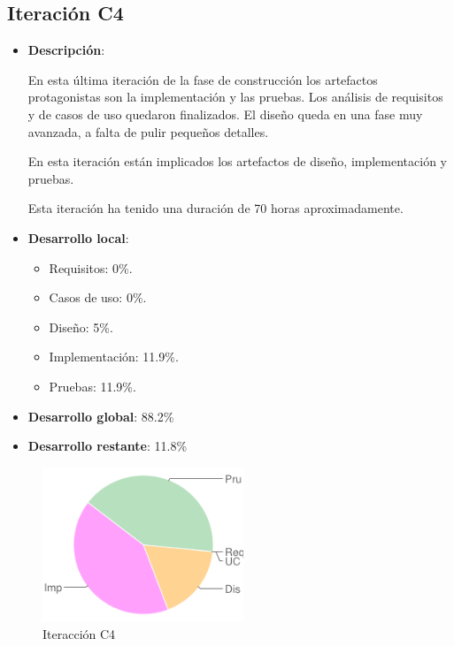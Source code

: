 \subsection*{Iteración C4}

\begin{itemize}    
\item {\bf Descripción}:

En esta última iteración de la fase de construcción los artefactos protagonistas son la implementación y las pruebas. Los análisis de requisitos y de casos de uso quedaron finalizados. El diseño queda en una fase muy avanzada, a falta de pulir pequeños detalles.

En esta iteración están implicados los artefactos de diseño, implementación y pruebas.

Esta iteración ha tenido una duración de 70 horas aproximadamente.
\end{itemize}

\begin{minipage}[c]{0.45\linewidth}
  \begin{itemize}    
  \item {\bf Desarrollo local}:
    \begin{itemize}
    \item Requisitos: 0\%.
    \item Casos de uso: 0\%.
    \item Diseño: 5\%.
    \item Implementación: 11.9\%.
    \item Pruebas: 11.9\%.
    \end{itemize}
  \item {\bf Desarrollo global}: 88.2\%
  \item {\bf Desarrollo restante}: 11.8\%
  \end{itemize}
\end{minipage}
\begin{minipage}[c]{0.45\linewidth}
  \begin{figure}[H]
    \begin{center}
      \includegraphics[width=6cm]{images/c4.png}

      \caption{Iteracción C4}
      \label{fig::c4}
    \end{center}
  \end{figure}
\end{minipage}


